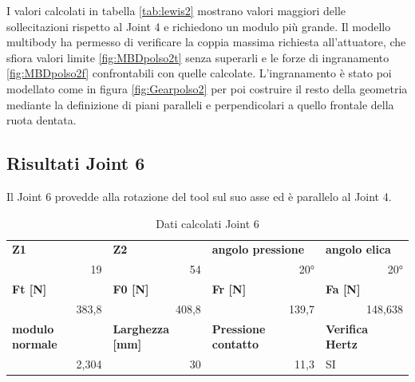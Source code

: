 \documentclass[%
corpo=11pt,
twoside,
 stile=classica,
oldstyle,
greek,%
]{toptesi}
\begin{document}
		I valori calcolati in tabella \ref{tab:lewis2} mostrano valori maggiori delle sollecitazioni rispetto al Joint 4 e richiedono un modulo più grande. 
		Il modello multibody ha permesso di verificare la coppia massima richiesta all'attuatore, che sfiora valori limite \ref{fig:MBDpolso2t} senza superarli e le forze di ingranamento \ref{fig:MBDpolso2f} confrontabili con quelle calcolate.
		L'ingranamento è stato poi modellato come in figura \ref{fig:Gearpolso2} per poi costruire il resto della geometria mediante la definizione di piani paralleli e perpendicolari a quello frontale della ruota dentata. 
		
	
	
	\subsection{Risultati Joint 6}
		Il Joint 6 provedde alla rotazione del tool sul suo asse ed è parallelo al Joint 4. 
	
		\begin{table}[H]
		\centering
		\caption{Dati calcolati Joint 6}
		\begin{tabular}{rrrl}
			\multicolumn{1}{l}{\textbf{Z1}} & \multicolumn{1}{l}{\textbf{Z2}} & \multicolumn{1}{l}{\textbf{angolo pressione}} & \textbf{angolo elica} \\
			19    & 54    & 20°    & \multicolumn{1}{r}{20°} \\
			\multicolumn{1}{l}{\textbf{Ft [N]}} & \multicolumn{1}{l}{\textbf{F0 [N]}} & \multicolumn{1}{l}{\textbf{Fr [N]}} & \textbf{Fa [N]} \\
			383,8 & 408,8 & 139,7 & \multicolumn{1}{r}{148,638} \\
			\multicolumn{1}{l}{\textbf{modulo normale}} & \multicolumn{1}{l}{\textbf{Larghezza [mm]}} & \multicolumn{1}{l}{\textbf{Pressione contatto}} & \textbf{Verifica Hertz} \\
			2,304 & 30    & 11,3  & SI \\
		\end{tabular}%
		\label{tab:lewis3}%
	\end{table}%
\end{document}
